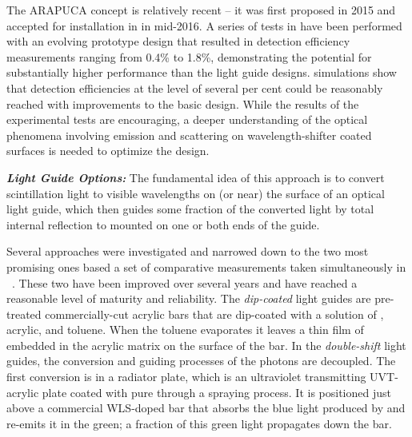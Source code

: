 
The ARAPUCA concept is relatively recent -- it was first proposed in 2015 and accepted for installation in  in mid-2016. A series of tests in \lar have been performed with an evolving prototype design that resulted in detection efficiency measurements ranging from  \num{0.4}\% to \num{1.8}\%, demonstrating the potential for substantially higher performance than the light guide designs.  simulations show that detection efficiencies at the level of several per cent could be reasonably reached with improvements to the basic design. 
While the results of the experimental tests are encouraging, a deeper understanding of the optical phenomena involving emission and scattering on wavelength-shifter coated surfaces is needed to optimize the design.

\textit{\bf Light Guide Options:} The fundamental idea of this approach is to convert  scintillation light to visible wavelengths on (or near) the surface of an optical light guide, which then guides some fraction of the converted light by total internal reflection to  mounted on one or both ends of the guide.

Several approaches were investigated and narrowed down to the two most promising ones based a set of comparative measurements taken simultaneously in \lar~\cite{Whittington:2015rkr}. These two have been improved over several years and have reached a reasonable level of maturity and reliability.
The \textit{ dip-coated} light guides are pre-treated commercially-cut acrylic bars that are dip-coated with a solution of , acrylic, and toluene. When the toluene evaporates it leaves a thin film of  embedded in the acrylic matrix on the surface of the bar.  In the \textit{double-shift} light guides, the conversion and guiding processes of the photons are decoupled. The first conversion is in a radiator plate, which is an ultraviolet transmitting UVT-acrylic plate coated with pure  through a spraying process. It is positioned 
just above a commercial WLS-doped bar that absorbs the blue light produced by  and re-emits it in the green; a fraction of this green light propagates down the bar. 

